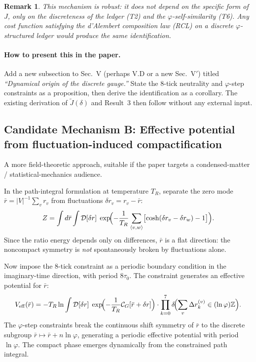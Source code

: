 \documentclass[11pt]{article}
\newtheorem{remark}{Remark}
\theoremstyle{definition}
\newcommand{\Jcost}{J}
\newcommand{\Jtilde}{\tilde{J}}
\newcommand{\TR}{{T_R}}
\newcommand{\phig}{\varphi}
\newcommand{\Ctotal}{\mathcal{C}}
\begin{document}
\begin{remark}
This mechanism is \emph{robust}: it does not depend on the specific form of $\Jcost$, only on the discreteness of the ledger (T2) and the $\phig$-self-similarity (T6). Any cost function satisfying the d'Alembert composition law (RCL) on a discrete $\phig$-structured ledger would produce the same identification.
\end{remark}

\paragraph{How to present this in the paper.} Add a new subsection to Sec.~V (perhaps V.D or a new Sec.~V$'$) titled \emph{``Dynamical origin of the discrete gauge.''} State the 8-tick neutrality and $\phig$-step constraints as a proposition, then derive the identification as a corollary. The existing derivation of $\Jtilde(\delta)$ and Result~3 then follow without any external input.


\subsection{Candidate Mechanism B: Effective potential from fluctuation-induced compactification}
\label{sec:mechB}

A more field-theoretic approach, suitable if the paper targets a condensed-matter / statistical-mechanics audience.

In the path-integral formulation at temperature $\TR$, separate the zero mode $\bar{r} = |V|^{-1} \sum_v r_v$ from fluctuations $\delta r_v = r_v - \bar{r}$:
\begin{equation}
Z = \int d\bar{r} \int \mathcal{D}[\delta r]\; \exp\!\Bigl(-\frac{1}{\TR}\sum_{\langle v,w\rangle} \bigl[\cosh(\delta r_v - \delta r_w) - 1\bigr]\Bigr).
\end{equation}
Since the ratio energy depends only on differences, $\bar{r}$ is a flat direction: the noncompact symmetry is \emph{not} spontaneously broken by fluctuations alone.

Now impose the 8-tick constraint as a periodic boundary condition in the imaginary-time direction, with period $8\tau_0$. The constraint generates an effective potential for $\bar{r}$:
\begin{equation}
V_{\mathrm{eff}}(\bar{r}) = -\TR \ln \int \mathcal{D}[\delta r]\; \exp\!\Bigl(-\frac{1}{\TR}\Ctotal_G[\bar{r} + \delta r]\Bigr) \cdot \prod_{k=0}^{7} \delta\!\Bigl(\sum_v \Delta r_k^{(v)} \in (\ln\phig)\mathbb{Z}\Bigr).
\end{equation}
The $\phig$-step constraints break the continuous shift symmetry of $\bar{r}$ to the discrete subgroup $\bar{r} \mapsto \bar{r} + n\ln\phig$, generating a periodic effective potential with period $\ln\phig$. The compact phase emerges dynamically from the constrained path integral.
\end{document}
